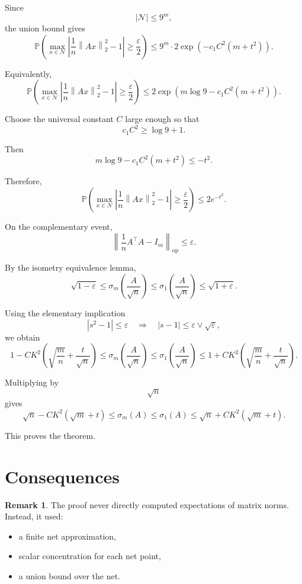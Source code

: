 \documentclass[12pt,oneside]{book}
\numberwithin{equation}{section}
\theoremstyle{definition}
\newtheorem{remark}{Remark}[section]
\theoremstyle{plain}
\theoremstyle{remark}
\newcommand{\Prob}{\mathbb{P}}
\newcommand{\norm}[1]{\left\lVert #1 \right\rVert}
\begin{document}
Since
\[
|\mathcal{N}|\leq 9^m,
\]
the union bound gives
\[
\Prob\left(
\max_{x\in\mathcal{N}}
\left|
\frac{1}{n}\norm{Ax}_2^2-1
\right|
\geq
\frac{\varepsilon}{2}
\right)
\leq
9^m\cdot
2\exp(-c_1C^2(m+t^2)).
\]

Equivalently,
\[
\Prob\left(
\max_{x\in\mathcal{N}}
\left|
\frac{1}{n}\norm{Ax}_2^2-1
\right|
\geq
\frac{\varepsilon}{2}
\right)
\leq
2\exp\left(
m\log 9-c_1C^2(m+t^2)
\right).
\]

Choose the universal constant $C$ large enough so that
\[
c_1C^2\geq \log 9+1.
\]

Then
\[
m\log 9-c_1C^2(m+t^2)
\leq
-t^2.
\]

Therefore,
\[
\Prob\left(
\max_{x\in\mathcal{N}}
\left|
\frac{1}{n}\norm{Ax}_2^2-1
\right|
\geq
\frac{\varepsilon}{2}
\right)
\leq
2e^{-t^2}.
\]

On the complementary event,
\[
\norm{\frac{1}{n}A^\top A-I_m}_{\mathrm{op}}
\leq
\varepsilon.
\]

By the isometry equivalence lemma,
\[
\sqrt{1-\varepsilon}
\leq
\sigma_m\left(\frac{A}{\sqrt{n}}\right)
\leq
\sigma_1\left(\frac{A}{\sqrt{n}}\right)
\leq
\sqrt{1+\varepsilon}.
\]

Using the elementary implication
\[
|s^2-1|\leq \varepsilon
\quad\Rightarrow\quad
|s-1|\leq \varepsilon\vee\sqrt{\varepsilon},
\]
we obtain
\[
1-CK^2\left(
\sqrt{\frac{m}{n}}+\frac{t}{\sqrt{n}}
\right)
\leq
\sigma_m\left(\frac{A}{\sqrt{n}}\right)
\leq
\sigma_1\left(\frac{A}{\sqrt{n}}\right)
\leq
1+CK^2\left(
\sqrt{\frac{m}{n}}+\frac{t}{\sqrt{n}}
\right).
\]

Multiplying by
\[
\sqrt{n}
\]
gives
\[
\sqrt{n}-CK^2(\sqrt{m}+t)
\leq
\sigma_m(A)
\leq
\sigma_1(A)
\leq
\sqrt{n}+CK^2(\sqrt{m}+t).
\]

This proves the theorem.

\section{Consequences}

\begin{remark}
The proof never directly computed expectations of matrix norms. Instead, it used:
\begin{itemize}
\item a finite net approximation,
\item scalar concentration for each net point,
\item a union bound over the net.
\end{itemize}
\end{remark}
\end{document}
